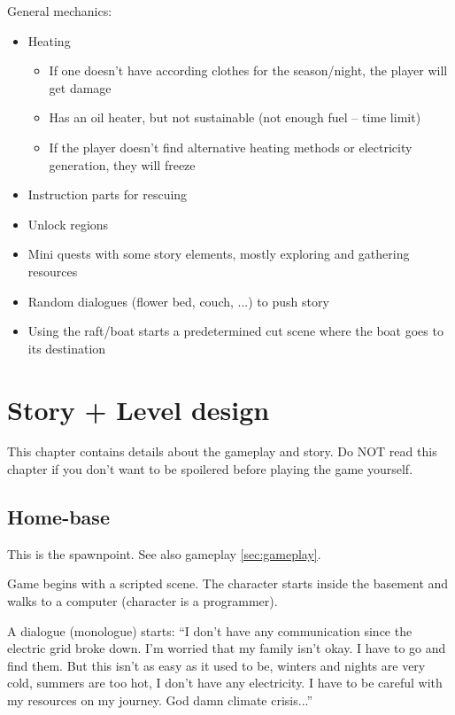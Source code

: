 \documentclass[a4paper]{scrreprt}
\begin{document}
General mechanics:
\begin{itemize}
    \item Heating
    \begin{itemize}
        \item If one doesn't have according clothes for the season/night, the player will get damage
        \item Has an oil heater, but not sustainable (not enough fuel -- time limit)
        \item If the player doesn't find alternative heating methods or electricity generation, they will freeze
    \end{itemize}
    \item Instruction parts for rescuing 
    \item Unlock regions
    \item Mini quests with some story elements, mostly exploring and gathering resources
    \item Random dialogues (flower bed, couch, ...) to push story
    \item Using the raft/boat starts a predetermined cut scene where the boat goes to its destination
\end{itemize}

\pagebreak
\section{Story + Level design}

This chapter contains details about the gameplay and story. Do NOT read this chapter if you don't want to be spoilered before playing the game yourself.

\subsection{Home-base}

This is the spawnpoint. See also gameplay \ref{sec:gameplay}.

Game begins with a scripted scene.
The character starts inside the basement and walks to a computer (character is a programmer).

A dialogue (monologue) starts: ``I don't have any communication since the electric grid broke down. I'm worried that my family isn't okay. I have to go and find them. But this isn't as easy as it used to be, winters and nights are very cold, summers are too hot, I don't have any electricity. I have to be careful with my resources on my journey. God damn climate crisis...''
\end{document}
